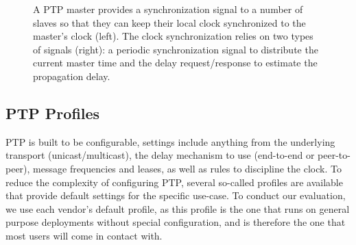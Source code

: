 \begin{figure}
    \caption{
        A PTP master provides a synchronization signal to a number of slaves so that they can keep their local clock synchronized to the master's clock (left). The clock synchronization relies on two types of signals (right): a periodic synchronization signal to distribute the current master time and the delay request/response to estimate the propagation delay.
    }
    \label{fig:ptp-architecture}
\end{figure}

\subsection{PTP Profiles}
PTP is built to be configurable, settings include anything from the underlying transport (unicast/multicast), the delay mechanism to use (end-to-end or peer-to-peer), message frequencies and leases, as well as rules to discipline the clock. To reduce the complexity of configuring PTP, several so-called profiles are available that provide default settings for the specific use-case.  To conduct our evaluation, we use each vendor's default profile, as this profile is the one that runs on general purpose deployments without special configuration, and is therefore the one that most users will come in contact with.

